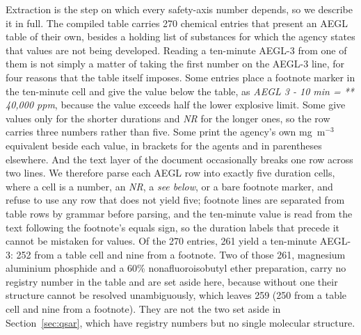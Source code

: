 \documentclass[11pt,a4paper]{article}
\begin{document}
Extraction is the step on which every safety-axis number depends, so we describe
it in full. The compiled table carries 270 chemical entries that present an AEGL
table of their own, besides a holding list of substances for which the agency
states that values are not being developed. Reading a
ten-minute AEGL-3 from one of them is not simply a matter of taking the first
number on the AEGL-3 line, for four reasons that the table itself imposes. Some
entries place a footnote marker in the ten-minute cell and give the value below
the table, as \textit{AEGL 3 - 10 min = ** 40,000 ppm}, because the value exceeds
half the lower explosive limit. Some give values only for the shorter durations
and \textit{NR} for the longer ones, so the row carries three numbers rather than
five. Some print the agency's own mg~m$^{-3}$ equivalent beside each value, in
brackets for the agents and in parentheses elsewhere. And the text layer of the
document occasionally breaks one row across two lines. We therefore parse each
AEGL row into exactly five duration cells, where a cell is a number, an
\textit{NR}, a \textit{see below}, or a bare footnote marker, and refuse to use
any row that does not yield five; footnote lines are separated from table rows by
grammar before parsing, and the ten-minute value is read from the text following
the footnote's equals sign, so the duration labels that precede it cannot be
mistaken for values. Of the 270 entries, 261 yield a ten-minute AEGL-3: 252 from a table cell and
nine from a footnote. Two of those 261, magnesium aluminium phosphide and a 60\%
nonafluoroisobutyl ether preparation, carry no registry number in the table and
are set aside here, because without one their structure cannot be resolved
unambiguously, which leaves 259 (250 from a table cell and nine from a
footnote). They are not the two set aside in Section~\ref{sec:qsar}, which have
registry numbers but no single molecular structure.
\end{document}
